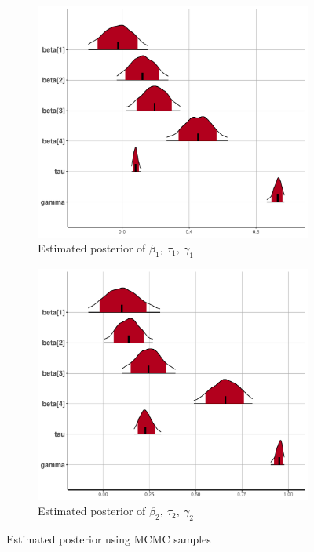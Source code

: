 \documentclass{scrartcl}
\begin{document}
\begin{figure}[!ht]
    \centering
    \begin{subfigure}[b]{0.45\textwidth}
        \centering
        \includegraphics[width=\textwidth]{../figs/mcmc/bmk_dens.pdf}
        \caption{Estimated posterior of $\beta_1,~\tau_1,~\gamma_1$}\label{fig:denseplot:bmk}
    \end{subfigure}
    \hfill
    \begin{subfigure}[b]{0.45\textwidth}   
        \centering 
        \includegraphics[width=\textwidth]{../figs/mcmc/l_dens.pdf}
        \caption{Estimated posterior of $\beta_2,~\tau_2,~\gamma_2$}\label{fig:denseplot:l}
    \end{subfigure}
    \caption{Estimated posterior using MCMC samples}
    \label{fig:denseplot}
\end{figure}   
\end{document}
